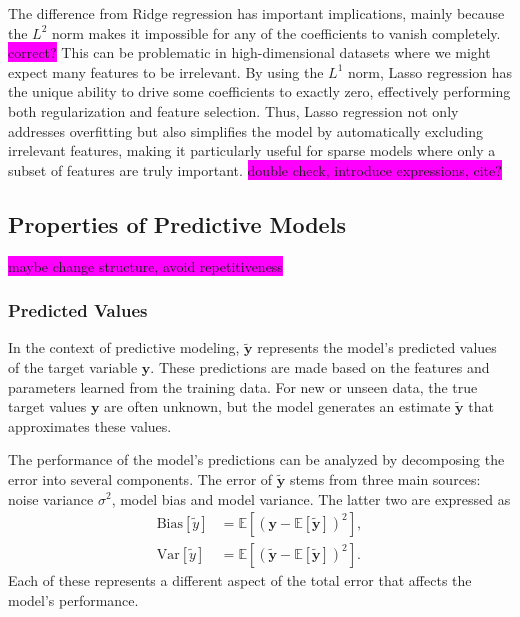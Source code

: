 \documentclass[aps,pra,english,notitlepage,reprint,nofootinbib]{revtex4-1}  %
\begin{document}
The difference from Ridge regression has important implications, mainly because the $L^2$ norm makes it impossible for any of the coefficients to vanish completely. \colorbox{magenta}{correct?} This can be problematic in high-dimensional datasets where we might expect many features to be irrelevant. By using the $L^1$ norm, Lasso regression has the unique ability to drive some coefficients to exactly zero, effectively performing both regularization and feature selection. Thus, Lasso regression not only addresses overfitting but also simplifies the model by automatically excluding irrelevant features, making it particularly useful for sparse models where only a subset of features are truly important.
\colorbox{magenta}{double check, introduce expressions, cite?}


\subsection{Properties of Predictive Models}\label{subsec:tradeoff}
\colorbox{magenta}{maybe change structure, avoid repetitiveness}

\subsubsection{Predicted Values}
In the context of predictive modeling, $\mathbf{\tilde{y}}$ represents the model's predicted values of the target variable $\mathbf{y}$. These predictions are made based on the features and parameters learned from the training data. For new or unseen data, the true target values $\mathbf{y}$ are often unknown, but the model generates an estimate $\mathbf{\tilde{y}}$ that approximates these values.

The performance of the model's predictions can be analyzed by decomposing the error into several components. The error of $\mathbf{\tilde{y}}$ stems from three main sources: noise variance $\sigma^2$, model bias and model variance. The latter two are expressed as
\begin{align}
  \text{Bias}\left[\tilde{y}\right] &= \mathbb{E}\left[\left(\mathbf{y}-\mathbb{E}\left[\mathbf{\tilde{y}}\right] \right)^2\right], \label{eq:Bias}
  \\
  \text{Var}\left[\tilde{y}\right] &= \mathbb{E}\left[\left(\mathbf{\tilde{y}}-\mathbb{E}\left[\mathbf{\tilde{y}}\right] \right)^2\right]. \label{eq:Var}
\end{align}
Each of these represents a different aspect of the total error that affects the model's performance.
\end{document}
